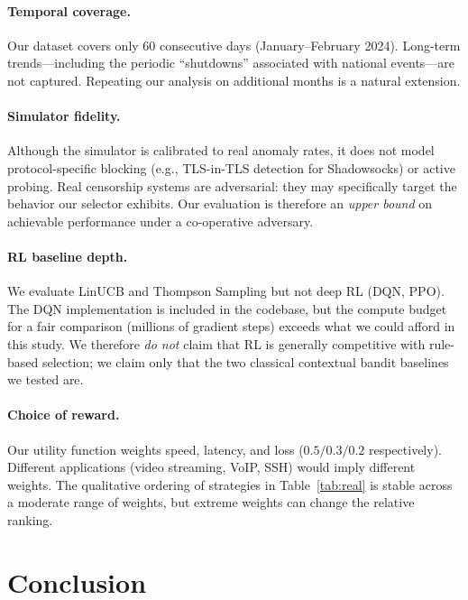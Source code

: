 \documentclass[11pt,a4paper]{article}
\begin{document}
\paragraph{Temporal coverage.}
Our dataset covers only 60 consecutive days (January--February 2024).
Long-term trends---including the periodic ``shutdowns'' associated
with national events---are not captured. Repeating our analysis on
additional months is a natural extension.

\paragraph{Simulator fidelity.}
Although the simulator is calibrated to real anomaly rates, it does
not model protocol-specific blocking (e.g., TLS-in-TLS detection for
Shadowsocks) or active probing. Real censorship systems are
adversarial: they may specifically target the behavior our selector
exhibits. Our evaluation is therefore an \emph{upper bound} on
achievable performance under a co-operative adversary.

\paragraph{RL baseline depth.}
We evaluate LinUCB and Thompson Sampling but not deep RL (DQN, PPO).
The DQN implementation is included in the codebase, but the
compute budget for a fair comparison (millions of gradient steps)
exceeds what we could afford in this study. We therefore
\emph{do not} claim that RL is generally competitive with rule-based
selection; we claim only that the two classical contextual bandit
baselines we tested are.

\paragraph{Choice of reward.}
Our utility function weights speed, latency, and loss
($0.5/0.3/0.2$ respectively). Different applications (video
streaming, VoIP, SSH) would imply different weights. The
qualitative ordering of strategies in Table~\ref{tab:real} is
stable across a moderate range of weights, but extreme weights
can change the relative ranking.

\section{Conclusion}
\label{sec:conclusion}
\end{document}
